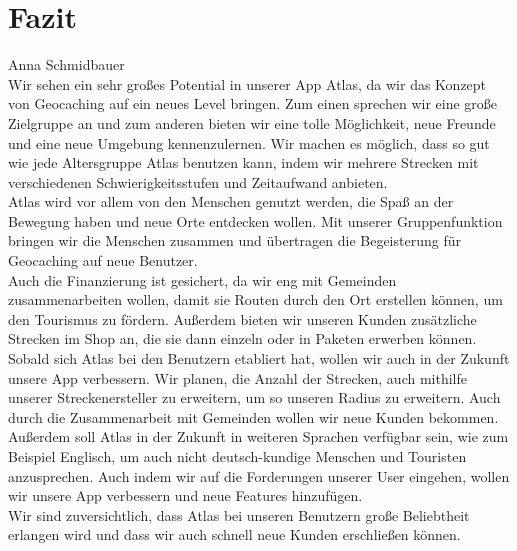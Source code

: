 \documentclass[a4paper, 12pt]{article}
\begin{document}
\section{Fazit}Anna Schmidbauer\\
Wir sehen ein sehr großes Potential in unserer App Atlas, da wir das Konzept von Geocaching auf ein neues Level bringen. Zum einen sprechen wir eine große Zielgruppe an und zum anderen bieten wir eine tolle Möglichkeit, neue Freunde und eine neue Umgebung kennenzulernen. Wir machen es möglich, dass so gut wie jede Altersgruppe Atlas benutzen kann, indem wir mehrere Strecken mit verschiedenen Schwierigkeitsstufen und Zeitaufwand anbieten.\\
Atlas wird vor allem von den Menschen genutzt werden, die Spaß an der Bewegung haben und neue Orte entdecken wollen. Mit unserer Gruppenfunktion bringen wir die Menschen zusammen und übertragen die Begeisterung für Geocaching auf neue Benutzer.\\
Auch die Finanzierung ist gesichert, da wir eng mit Gemeinden zusammenarbeiten wollen, damit sie Routen durch den Ort erstellen können, um den Tourismus zu fördern. Außerdem bieten wir unseren Kunden zusätzliche Strecken im Shop an, die sie dann einzeln oder in Paketen erwerben können.\\
Sobald sich Atlas bei den Benutzern etabliert hat, wollen wir auch in der Zukunft unsere App verbessern. Wir planen, die Anzahl der Strecken, auch mithilfe unserer Streckenersteller zu erweitern, um so unseren Radius zu erweitern. Auch durch die Zusammenarbeit mit Gemeinden wollen wir neue Kunden bekommen. Außerdem soll Atlas in der Zukunft in weiteren Sprachen verfügbar sein, wie zum Beispiel Englisch, um auch nicht deutsch-kundige Menschen und Touristen anzusprechen. Auch indem wir auf die Forderungen unserer User eingehen, wollen wir unsere App verbessern und neue Features hinzufügen.\\
Wir sind zuversichtlich, dass Atlas bei unseren Benutzern große Beliebtheit erlangen wird und dass wir auch schnell neue Kunden erschließen können.\\
\end{document}
